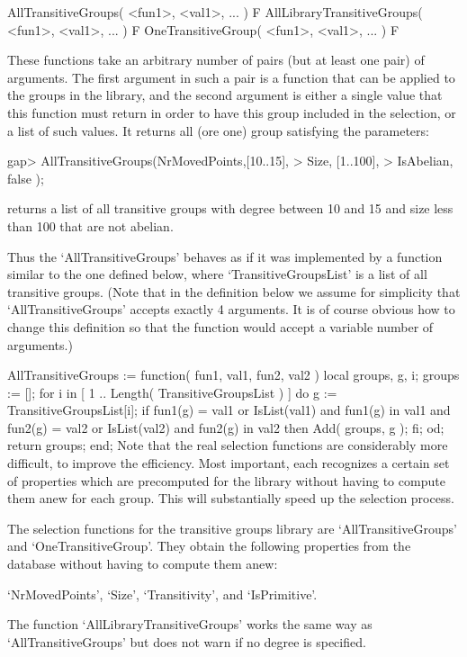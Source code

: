 \>AllTransitiveGroups( <fun1>, <val1>, ... ) F
\>AllLibraryTransitiveGroups( <fun1>, <val1>, ... ) F
\>OneTransitiveGroup( <fun1>, <val1>, ... ) F

These functions take an arbitrary number of pairs (but at least one pair)
of arguments. The first argument in such a pair is a function that can be
applied to the groups in the library, and the second argument is either a
single value that this function must return in order to have  this  group
included in the selection, or a list of such  values. 
It returns all (ore one) group satisfying the parameters:

\beginexample
gap> AllTransitiveGroups(NrMovedPoints,[10..15],
>                        Size,         [1..100],
>                        IsAbelian,    false    );
\endexample

returns a list of all transitive groups with degree between 10 and 15 and
size less than 100 that are not abelian.

Thus  the `AllTransitiveGroups'  behaves  as if   it was implemented  by a
function similar to the one defined below, where `TransitiveGroupsList' is a
list of all transitive groups.  (Note that in  the definition below we assume
for simplicity that `AllTransitiveGroups' accepts exactly 4 arguments.  It is
of course  obvious how to change this  definition so that the function would
accept a variable number of arguments.)

\begintt
AllTransitiveGroups := function( fun1, val1, fun2, val2 )
local    groups, g, i;
  groups := [];
  for i  in [ 1 .. Length( TransitiveGroupsList ) ] do
    g := TransitiveGroupsList[i];
    if      fun1(g) = val1  or IsList(val1) and fun1(g) in val1
        and fun2(g) = val2  or IsList(val2) and fun2(g) in val2
     then
      Add( groups, g );
    fi;
  od;
  return groups;
end;
\endtt
Note that the real  selection functions are considerably  more difficult,
to improve the efficiency. Most  important, each recognizes a certain set
of properties which are precomputed for the library without having to
compute them anew for each group. This will substantially speed up the
selection process.

The selection functions for the transitive
groups library are `AllTransitiveGroups' and `OneTransitiveGroup'. They
obtain the following properties from the database without having to compute
them anew:

`NrMovedPoints', `Size',   `Transitivity', and `IsPrimitive'.

The function `AllLibraryTransitiveGroups' works the same way as
`AllTransitiveGroups' but does not warn if no degree is specified.

